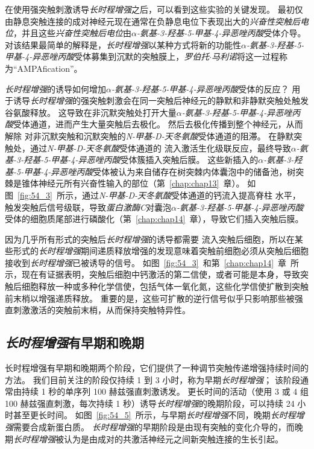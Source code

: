 在使用强突触刺激诱导\textit{长时程增强}之后，可以看到这些实验的关键发现。
最初仅由静息突触连接的成对神经元现在通常在负静息电位下表现出大的\textit{兴奋性突触后电位}，并且这些\textit{兴奋性突触后电位}由\textit{$\alpha$-氨基-3-羟基-5-甲基-4-异恶唑丙酸}受体介导。
对该结果最简单的解释是，\textit{长时程增强}以某种方式将新的功能性\textit{$\alpha$-氨基-3-羟基-5-甲基-4-异恶唑丙酸}受体募集到沉默的突触膜上，\textit{罗伯托$\cdot$马利诺}将这一过程称为“AMPAfication”。


\textit{长时程增强}的诱导如何增加\textit{$\alpha$-氨基-3-羟基-5-甲基-4-异恶唑丙酸}受体的反应？
用于诱导\textit{长时程增强}的强突触刺激会在同一突触后神经元的静默和非静默突触处触发谷氨酸释放。
这导致在非沉默突触处打开大量\textit{$\alpha$-氨基-3-羟基-5-甲基-4-异恶唑丙酸}受体通道，进而产生大量突触后去极化。
然后去极化传播到整个神经元，从而解除  对非沉默突触和沉默突触的\textit{N-甲基-D-天冬氨酸}受体通道的阻滞。
在静默突触处，通过\textit{N-甲基-D-天冬氨酸}受体通道的  流入激活生化级联反应，最终导致\textit{$\alpha$-氨基-3-羟基-5-甲基-4-异恶唑丙酸}受体簇插入突触后膜。
这些新插入的\textit{$\alpha$-氨基-3-羟基-5-甲基-4-异恶唑丙酸}受体被认为来自储存在树突棘内体囊泡中的储备池，树突棘是锥体神经元所有兴奋性输入的部位（第~\ref{chap:chap13}~章）。
如图~\ref{fig:54_3}~所示，通过\textit{N-甲基-D-天冬氨酸}受体通道的钙流入提高脊柱  水平，触发突触后信号级联，导致\textit{蛋白激酶C}对囊泡\textit{$\alpha$-氨基-3-羟基-5-甲基-4-异恶唑丙酸}受体的细胞质尾部进行磷酸化（第~\ref{chap:chap14}~章），导致它们插入突触后膜。


因为几乎所有形式的突触后\textit{长时程增强}的诱导都需要  流入突触后细胞，所以在某些形式的\textit{长时程增强}期间递质释放增强的发现意味着突触前细胞必须从突触后细胞接收到\textit{长时程增强}已被诱导的信号。
如图~\ref{fig:54_3}~和第~\ref{chap:chap14}~章~所示，现在有证据表明，突触后细胞中钙激活的第二信使，或者可能是本身，导致突触后细胞释放一种或多种化学信使，包括气体一氧化氮，这些化学信使扩散到突触前末梢以增强递质释放。
重要的是，这些可扩散的逆行信号似乎只影响那些被强直刺激激活的突触前末梢，从而保持突触特异性。



\subsection{\textit{长时程增强}有早期和晚期}

长时程增强有早期和晚期两个阶段，它们提供了一种调节突触传递增强持续时间的方法。
我们目前关注的阶段仅持续 1 到 3 小时，称为早期\textit{长时程增强}；
该阶段通常由持续 1 秒的单序列 100 赫兹强直刺激诱发。
更长时间的活动（使用 3 或 4 组 100 赫兹强直刺激，每次持续 1 秒）诱导\textit{长时程增强}的晚期阶段，可以持续 24 小时甚至更长时间。
如图~\ref{fig:54_5}~所示，与早期\textit{长时程增强}不同，晚期\textit{长时程增强}需要合成新蛋白质。
\textit{长时程增强}的早期阶段是由现有突触的变化介导的，而晚期\textit{长时程增强}被认为是由成对的共激活神经元之间新突触连接的生长引起。


